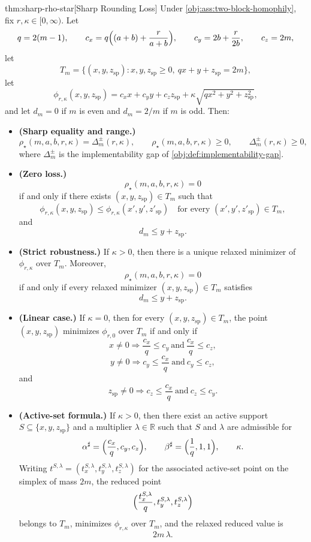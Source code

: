 \documentclass[11pt]{article}
\begin{document}
\begin{theoremv}{thm:sharp-rho-star}[Sharp Rounding Loss]
Under \cref{obj:ass:two-block-homophily}, fix $r,\kappa\in[0,\infty)$.  Let
\[
q=2(m-1),\qquad
c_x=q\Bigl((a+b)+\frac{r}{a+b}\Bigr),\qquad
c_y=2b+\frac{r}{2b},\qquad
c_z=2m,
\]
let
\[
T_m=\{(x,y,z_{\mathrm{sp}}):x,y,z_{\mathrm{sp}}\ge0,\ qx+y+z_{\mathrm{sp}}=2m\},
\]
let
\[
\phi_{r,\kappa}(x,y,z_{\mathrm{sp}})
=c_xx+c_yy+c_zz_{\mathrm{sp}}
+\kappa\sqrt{qx^2+y^2+z_{\mathrm{sp}}^2},
\]
and let $d_m=0$ if $m$ is even and $d_m=2/m$ if $m$ is odd.  Then:
\begin{itemize}
\item \textbf{(Sharp equality and range.)}
\[
\rho_\star(m,a,b,r,\kappa)=\Delta_m^{\pm}(r,\kappa),
\qquad
\rho_\star(m,a,b,r,\kappa)\ge0,
\qquad
\Delta_m^{\pm}(r,\kappa)\ge0,
\]
where $\Delta_m^{\pm}$ is the implementability gap of \cref{obj:def:implementability-gap}.

\item \textbf{(Zero loss.)}
\[
\rho_\star(m,a,b,r,\kappa)=0
\]
if and only if there exists $(x,y,z_{\mathrm{sp}})\in T_m$ such that
\[
\phi_{r,\kappa}(x,y,z_{\mathrm{sp}})
\le
\phi_{r,\kappa}(x',y',z'_{\mathrm{sp}})
\quad\text{for every }(x',y',z'_{\mathrm{sp}})\in T_m,
\]
and
\[
d_m\le y+z_{\mathrm{sp}}.
\]

\item \textbf{(Strict robustness.)}
If $\kappa>0$, then there is a unique relaxed minimizer of $\phi_{r,\kappa}$ over $T_m$.  Moreover,
\[
\rho_\star(m,a,b,r,\kappa)=0
\]
if and only if every relaxed minimizer $(x,y,z_{\mathrm{sp}})\in T_m$ satisfies
\[
d_m\le y+z_{\mathrm{sp}}.
\]

\item \textbf{(Linear case.)}
If $\kappa=0$, then for every $(x,y,z_{\mathrm{sp}})\in T_m$, the point $(x,y,z_{\mathrm{sp}})$ minimizes $\phi_{r,0}$ over $T_m$ if and only if
\[
x\ne0\Rightarrow \frac{c_x}{q}\le c_y\ \text{and}\ \frac{c_x}{q}\le c_z,
\]
\[
y\ne0\Rightarrow c_y\le \frac{c_x}{q}\ \text{and}\ c_y\le c_z,
\]
and
\[
z_{\mathrm{sp}}\ne0\Rightarrow c_z\le \frac{c_x}{q}\ \text{and}\ c_z\le c_y.
\]

\item \textbf{(Active-set formula.)}
If $\kappa>0$, then there exist an active support $S\subseteq\{x,y,z_{\mathrm{sp}}\}$ and a multiplier $\lambda\in\mathbb R$ such that $S$ and $\lambda$ are admissible for
\[
\alpha^\sharp=\Bigl(\frac{c_x}{q},c_y,c_z\Bigr),
\qquad
\beta^\sharp=\Bigl(\frac1q,1,1\Bigr),
\qquad
\kappa.
\]
Writing $t^{S,\lambda}=(t_x^{S,\lambda},t_y^{S,\lambda},t_z^{S,\lambda})$ for the associated active-set point on the simplex of mass $2m$, the reduced point
\[
\Bigl(\frac{t_x^{S,\lambda}}{q},t_y^{S,\lambda},t_z^{S,\lambda}\Bigr)
\]
belongs to $T_m$, minimizes $\phi_{r,\kappa}$ over $T_m$, and the relaxed reduced value is
\[
2m\,\lambda.
\]


\end{itemize}
\end{theoremv}
\end{document}
